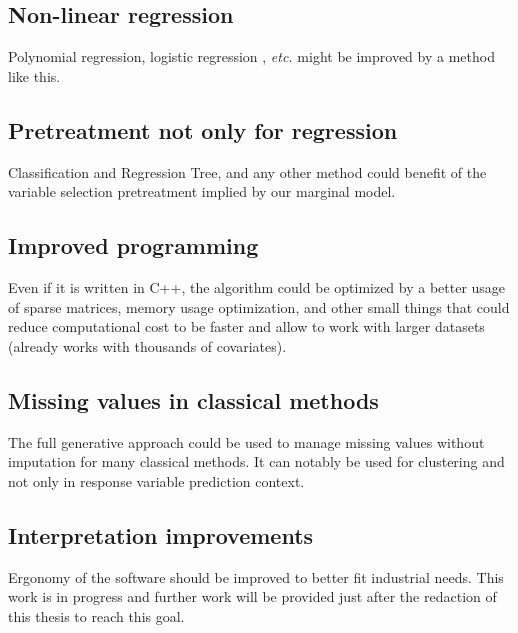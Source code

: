 \documentclass[12pt,a4paper]{report}
\begin{document}
		\subsection{Non-linear regression}
			Polynomial regression, logistic regression \cite{hosmer2000applied}, {\it etc.} might be improved by a method like this.
		\subsection{Pretreatment not only for regression}
			Classification and Regression Tree, and any other method could benefit of the variable selection pretreatment implied by our marginal model.
		\subsection{Improved programming}
			Even if it is written in C++, the algorithm could be optimized by a better usage of sparse matrices, memory usage optimization, and other small things that could reduce computational cost to be faster and allow to work with larger datasets (already works with thousands of covariates).
		\subsection{Missing values in classical methods}
			The full generative approach could be used to manage missing values without imputation for many classical methods.
			It can notably be used for clustering and not only in response variable prediction context.
		\subsection{Interpretation improvements}
			Ergonomy of the software should be improved to better fit industrial needs. This work is in progress and further work will be provided just after the redaction of this thesis to reach this goal.
\cleardoublepage
\end{document}
